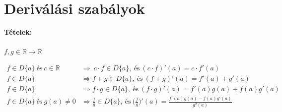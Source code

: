 \documentclass[10pt,a4paper]{article}
\begin{document}
\section{Deriválási szabályok}
\textbf{Tételek:} \\ \\
$f,g \in \mathbb{R} \rightarrow \mathbb{R}$

\begin{align*}
f\in D\{a\} \: \text{és} \: c \in \mathbb{R} \: &\Longrightarrow \: c\cdot f \in D\{a\}, \: \text{és} \: (c \cdot f)'(a)=c\cdot f'(a) \\
f\in D\{a\} &\Longrightarrow  f+g\in D\{a\},\: \text{és} \: (f+g)'(a) =f'(a) + g'(a)   \\
f\in D\{a\}  &\Longrightarrow  f\cdot g \in D\{a\}, \:  \text{és} \: (f\cdot g)'(a) = f'(a)g(a)+ f(a)g'(a) \\
f\in D\{a\} \: \text{és} \:  g(a)\neq 0  &\Longrightarrow  \frac{f}{g} \in D\{a\}, \: \text{és} \: \Big(\frac{f}{g} \Big)' (a) = \frac{f'(a)g(a)-f(a)g'(a)}{g^2(a)}
\end{align*}
\end{document}
